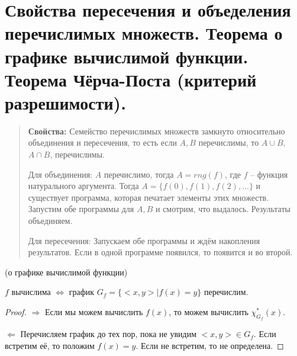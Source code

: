 \section{Свойства пересечения и объеделения перечислимых множеств. Теорема о графике вычислимой функции. Теорема
Чёрча-Поста (критерий разрешимости).}
\begin{quote}{\textbf{Свойства: }}
	Семейство перечислимых множеств замкнуто относительно объединения и пересечения, то есть если $A, B$ перечислимы,
	то $A \cup B$, $A \cap B$, перечислимы.
	\par Для объединения: $A$ перечислимо, тогда $A=rng(f)$, где $f$ -- функция натурального аргумента. Тогда $A = \{
		f(0), f(1), f(2), \dots \}$ и существует программа, которая печатает элементы этих множеств. Запустим обе
	программы для $A, B$ и смотрим, что выдалось. Результаты объединяем.
	\par Для пересечения: Запускаем обе программы и ждём накопления результатов. Если в одной программе появился, то
	появится и во второй.
\end{quote}
\begin{theorem}{(о графике вычислимой функции)}
	\par$f$ вычислима $\iff$ график $G_{f} = \{<x,y> | f(x) = y\}$ перечислим.
	\begin{proof}
		\par $\Longrightarrow$ Если мы можем вычислить $f(x)$, то можем вычислить $\chi^*_{G_f}(x)$.
		\par $\Longleftarrow$ Перечисляем график до тех пор, пока не увидим $<x,y> \in G_{f}$. Если встретим её, то положим
		$f(x) = y$. Если не встретим, то не определена.
	\end{proof}
\end{theorem}
